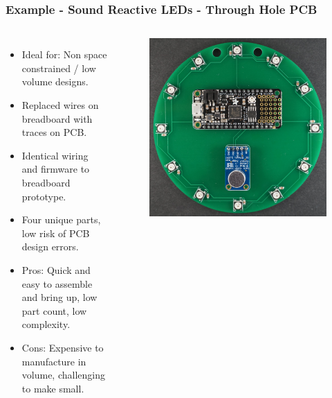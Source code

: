\documentclass[aspectratio=169, t]{beamer}
\begin{document}
\begin{frame}
\frametitle{Example - Sound Reactive LEDs - Through Hole PCB}
\vspace{-5mm}
\begin{columns}
	\begin{itemize}
		\item Ideal for: Non space constrained / low volume designs.
		\item Replaced wires on breadboard with traces on PCB.
		\item Identical wiring and firmware to breadboard prototype.
		\item Four unique parts, low risk of PCB design errors.
		\item Pros: Quick and easy to assemble and bring up, low part count, low complexity.
		\item Cons: Expensive to manufacture in volume, challenging to make small.
	\end{itemize}
	\begin{figure}
		\includegraphics[width=0.9\linewidth]{images/circle-feather.JPG}
	\end{figure}
\end{columns}
\end{frame}
\end{document}
